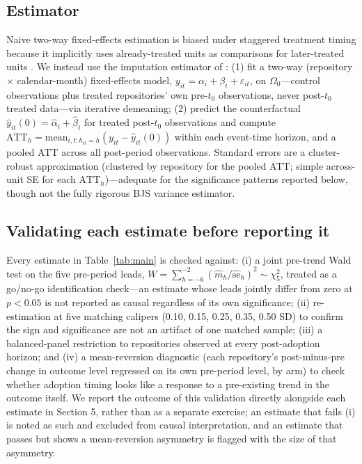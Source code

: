 \documentclass[12pt]{article}
\begin{document}
\subsection{Estimator}

Naive two-way fixed-effects estimation is biased under staggered treatment
timing because it implicitly uses already-treated units as comparisons
for later-treated units \cite{goodman2021difference,callaway2021difference}.
We instead use the imputation estimator of \citet{borusyak2024revisiting}:
(1) fit a two-way (repository $\times$ calendar-month) fixed-effects model,
$y_{it}=\alpha_i+\beta_t+\varepsilon_{it}$, on $\Omega_0$---control
observations plus treated repositories' own pre-$t_0$ observations, never
post-$t_0$ treated data---via iterative demeaning; (2) predict the
counterfactual $\hat y_{it}(0)=\hat\alpha_i+\hat\beta_t$ for treated
post-$t_0$ observations and compute
$\text{ATT}_h=\text{mean}_{i,t:h_{it}=h}(y_{it}-\hat y_{it}(0))$ within
each event-time horizon, and a pooled ATT across all post-period
observations. Standard errors are a cluster-robust approximation
(clustered by repository for the pooled ATT; simple across-unit SE for
each $\text{ATT}_h$)---adequate for the significance patterns reported
below, though not the fully rigorous BJS variance estimator.

\subsection{Validating each estimate before reporting it}

Every estimate in Table~\ref{tab:main} is checked against: (i) a joint
pre-trend Wald test on the five pre-period leads,
$W=\sum_{h=-6}^{-2}(\hat m_h/\widehat{\text{se}}_h)^2\sim\chi^2_5$, treated
as a go/no-go identification check---an estimate whose leads jointly
differ from zero at $p<0.05$ is not reported as causal regardless of its
own significance; (ii) re-estimation at five matching calipers (0.10,
0.15, 0.25, 0.35, 0.50 SD) to confirm the sign and significance are not
an artifact of one matched sample; (iii) a balanced-panel restriction to
repositories observed at every post-adoption horizon; and (iv) a
mean-reversion diagnostic (each repository's post-minus-pre change in
outcome level regressed on its own pre-period level, by arm) to check
whether adoption timing looks like a response to a pre-existing trend in
the outcome itself. We report the outcome of this validation directly
alongside each estimate in Section 5, rather than as a separate exercise;
an estimate that fails (i) is noted as such and excluded from causal
interpretation, and an estimate that passes but shows a mean-reversion
asymmetry is flagged with the size of that asymmetry.
\end{document}
